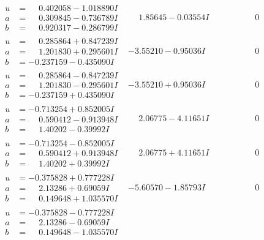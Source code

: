 \documentclass[1p]{elsarticle_modified}
\theoremstyle{definition}
\begin{document}
$$\begin{array}{c|c|c}
\begin{aligned}
u &= \phantom{-}0.402058 - 1.018890 I \\
a &= \phantom{-}0.309845 - 0.736789 I \\
b &= \phantom{-}0.920317 - 0.286799 I\end{aligned}
 & \phantom{-}1.85645 - 0.03554 I & \phantom{-0.000000 } 0 \\ \hline\begin{aligned}
u &= \phantom{-}0.285864 + 0.847239 I \\
a &= \phantom{-}1.201830 + 0.295601 I \\
b &= -0.237159 - 0.435090 I\end{aligned}
 & -3.55210 - 0.95036 I & \phantom{-0.000000 } 0 \\ \hline\begin{aligned}
u &= \phantom{-}0.285864 - 0.847239 I \\
a &= \phantom{-}1.201830 - 0.295601 I \\
b &= -0.237159 + 0.435090 I\end{aligned}
 & -3.55210 + 0.95036 I & \phantom{-0.000000 } 0 \\ \hline\begin{aligned}
u &= -0.713254 + 0.852005 I \\
a &= \phantom{-}0.590412 - 0.913948 I \\
b &= \phantom{-}1.40202 - 0.39992 I\end{aligned}
 & \phantom{-}2.06775 - 4.11651 I & \phantom{-0.000000 } 0 \\ \hline\begin{aligned}
u &= -0.713254 - 0.852005 I \\
a &= \phantom{-}0.590412 + 0.913948 I \\
b &= \phantom{-}1.40202 + 0.39992 I\end{aligned}
 & \phantom{-}2.06775 + 4.11651 I & \phantom{-0.000000 } 0 \\ \hline\begin{aligned}
u &= -0.375828 + 0.777228 I \\
a &= \phantom{-}2.13286 + 0.69059 I \\
b &= \phantom{-}0.149648 + 1.035570 I\end{aligned}
 & -5.60570 - 1.85793 I & \phantom{-0.000000 } 0 \\ \hline\begin{aligned}
u &= -0.375828 - 0.777228 I \\
a &= \phantom{-}2.13286 - 0.69059 I \\
b &= \phantom{-}0.149648 - 1.035570 I\end{aligned}

\end{array}$$
\end{document}
